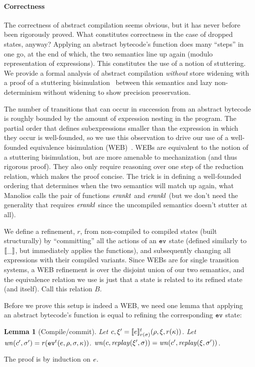 \documentclass[9pt]{sigplanconf} %
\newtheorem{lemma}{Lemma}
\begin{document}
\paragraph{Correctness}
The correctness of abstract compilation seems obvious, but it has
never before been rigorously proved. What constitutes correctness in
the case of dropped states, anyway? Applying an abstract bytecode's
function does many ``steps'' in one go, at the end of which, the two
semantics line up again (modulo representation of expressions). This
constitutes the use of a notion of stuttering. We provide a formal
analysis of abstract compilation \emph{without} store widening with a proof
of a stuttering bisimulation~\cite{ianjohnson:BCG88} between this
semantics and lazy non-determinism without widening to show precision
preservation. %

The number of transitions that can occur in succession from an
abstract bytecode is roughly bounded by the amount of expression
nesting in the program. The partial order that defines subexpressions
smaller than the expression in which they occur is well-founded, so we
use this observation to drive our use of a well-founded equivalence
bisimulation (WEB)~\cite{ianjohnson:manolios-diss}. WEBs are
equivalent to the notion of a stuttering bisimulation, but are more
amenable to mechanization (and thus rigorous proof). They also only
require reasoning over one step of the reduction relation, which makes
the proof concise. The trick is in defining a well-founded ordering
that determines when the two semantics will match up again, what
Manolios calls the pair of functions $\erankt$ and $\erankl$ (but we
don't need the generality that requires $\erankl$ since the uncompiled
semantics doesn't stutter at all).

We define a refinement, $r$, from non-compiled to compiled states (built structurally) by
``committing'' all the actions of an $\evalone$ state (defined similarly to
$\compile{\_}$, but immediately applies the functions), and
subsequently changing all expressions with their compiled
variants. Since WEBs are for single transition systems, a WEB
refinement is over the disjoint union of our two semantics, and the
equivalence relation we use is just that a state is related to its
refined state (and itself). Call this relation $B$.

Before we prove this setup is indeed a WEB, we need one lemma that
applying an abstract bytecode's function is equal to refining the
corresponding $\evalone$ state:
%
\begin{lemma}[Compile/commit]
Let $c,\msdiff' = \compile{\mexp}^\mcntr_{r(\msto)}(\menv,\msdiff,r(\mkont))$.
Let $\wn(c',\msto') = r(\ev[^\mcntr]{\mexp,\menv,\msto,\mkont})$.
$\wn(c,\replay(\msdiff',\msto)) = \wn(c',\replay(\msdiff,\msto'))$.
\end{lemma}
The proof is by induction on $\mexp$.
\end{document}
